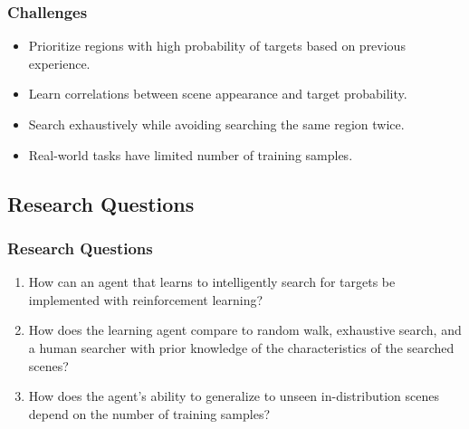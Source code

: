 \begin{frame}
    \frametitle{Challenges}

    \begin{itemize}
        \item Prioritize regions with high probability of targets based on previous experience.
        \item Learn correlations between scene appearance and target probability.
        \item Search exhaustively while avoiding searching the same region twice.
        \item Real-world tasks have limited number of training samples.
    \end{itemize}
\end{frame}

\subsection{Research Questions}

\begin{frame}
    \frametitle{Research Questions}
    \begin{enumerate}
        \item How can an agent that learns to intelligently search for targets be implemented with reinforcement learning?
        \item How does the learning agent compare to random walk, exhaustive search, and a human searcher with prior knowledge of the characteristics of the searched scenes?
        \item How does the agent's ability to generalize to unseen in-distribution scenes depend on the number of training samples?
    \end{enumerate}    
\end{frame}